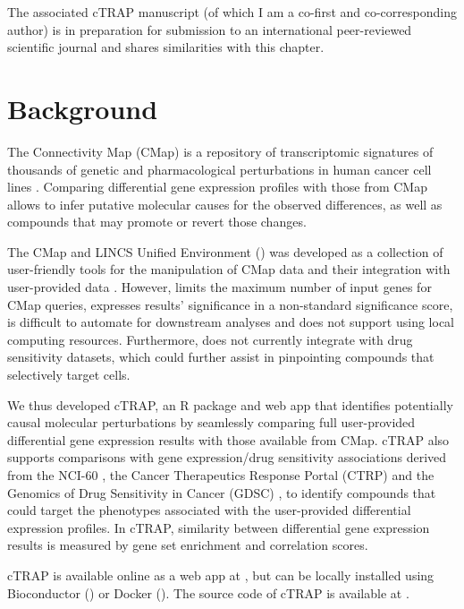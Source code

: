 The associated cTRAP manuscript (of which I am a co-first and co-corresponding author) is in preparation for submission to an international peer-reviewed scientific journal and shares similarities with this chapter.

\section{Background}

The Connectivity Map (CMap) is a repository of transcriptomic signatures of thousands of genetic and pharmacological perturbations in human cancer cell lines \cite{subramanian:2017ul}. Comparing differential gene expression profiles with those from CMap allows to infer putative molecular causes for the observed differences, as well as compounds that may promote or revert those changes.

The CMap and LINCS Unified Environment () was developed as a collection of user-friendly tools for the manipulation of CMap data and their integration with user-provided data \cite{subramanian:2017ul}. However,  limits the maximum number of input genes for CMap queries, expresses results' significance in a non-standard significance score, is difficult to automate for downstream analyses and does not support using local computing resources. Furthermore,  does not currently integrate with drug sensitivity datasets, which could further assist in pinpointing compounds that selectively target cells.

We thus developed cTRAP, an R package and web app that identifies potentially causal molecular perturbations by seamlessly comparing full user-provided differential gene expression results with those available from CMap. cTRAP also supports comparisons with gene expression/drug sensitivity associations derived from the NCI-60 \cite{shoemaker:2006wi}, the Cancer Therapeutics Response Portal (CTRP) \cite{seashore-ludlow:2015ws} and the Genomics of Drug Sensitivity in Cancer (GDSC) \cite{yang:2012vk}, to identify compounds that could target the phenotypes associated with the user-provided differential expression profiles. In cTRAP, similarity between differential gene expression results is measured by gene set enrichment \cite{subramanian:2017ul,subramanian:2005wu} and correlation scores.

cTRAP is available online as a web app at , but can be locally installed using Bioconductor () or Docker (). The source code of cTRAP is available at .

